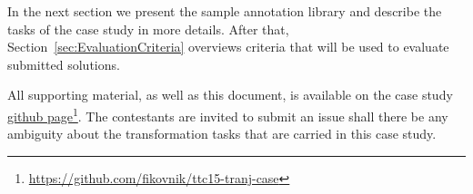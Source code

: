 In the next section we present the sample annotation library and describe the tasks of the case study in more details.
After that, Section~\ref{sec:EvaluationCriteria} overviews criteria that will be used to evaluate submitted solutions.

All supporting material, as well as this document, is available on the case study \href{https://github.com/fikovnik/ttc15-tranj-case}{github page}\footnote{\url{https://github.com/fikovnik/ttc15-tranj-case}}.
The contestants are invited to submit an issue shall there be any ambiguity about the transformation tasks that are carried in this case study.